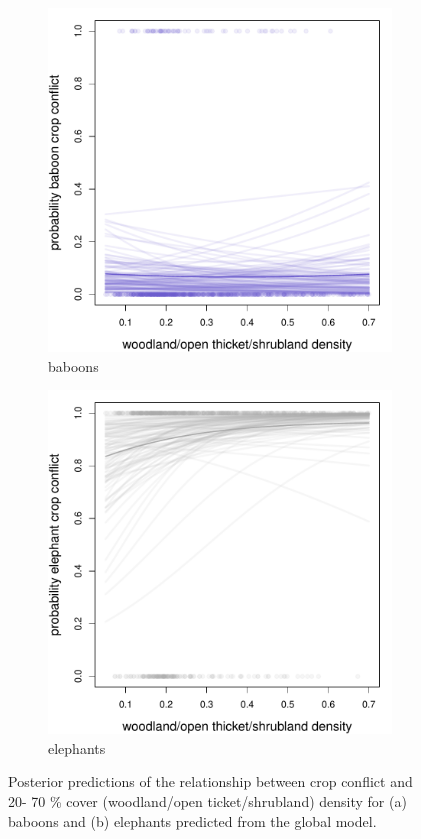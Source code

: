 \documentclass[12pt,]{article}
\begin{document}
\begin{figure}[H]
  \centering
	\begin{subfigure}[b]{0.49\textwidth}
	\includegraphics[width=\textwidth]{Figures/c2070_crop_global_conflict_bab.pdf} 
    \caption{baboons}
   	    \label{fig:cropC2070bab}
\end{subfigure}
\begin{subfigure}[b]{0.49\textwidth}
	\includegraphics[width=\textwidth]{Figures/c2070_crop_global_conflict_ele.pdf}  
    \caption{elephants}
  	\label{fig:cropC2070ele}
\end{subfigure}
\caption{Posterior predictions of the relationship between crop conflict and 20- 70 \% cover (woodland/open ticket/shrubland) density for (a) baboons and (b) elephants predicted from the global model.}
\end{figure}
\end{document}
